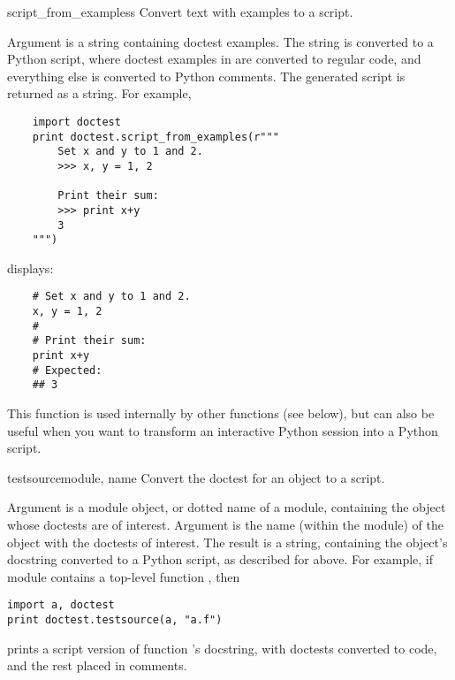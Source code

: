 \begin{funcdesc}{script_from_examples}{s}
  Convert text with examples to a script.

  Argument  is a string containing doctest examples.  The string
  is converted to a Python script, where doctest examples in 
  are converted to regular code, and everything else is converted to
  Python comments.  The generated script is returned as a string.
  For example,

    \begin{verbatim}
    import doctest
    print doctest.script_from_examples(r"""
        Set x and y to 1 and 2.
        >>> x, y = 1, 2

        Print their sum:
        >>> print x+y
        3
    """)
    \end{verbatim}

  displays:

    \begin{verbatim}
    # Set x and y to 1 and 2.
    x, y = 1, 2
    #
    # Print their sum:
    print x+y
    # Expected:
    ## 3
    \end{verbatim}

  This function is used internally by other functions (see below), but
  can also be useful when you want to transform an interactive Python
  session into a Python script.

\end{funcdesc}

\begin{funcdesc}{testsource}{module, name}
   Convert the doctest for an object to a script.

   Argument  is a module object, or dotted name of a module,
   containing the object whose doctests are of interest.  Argument
    is the name (within the module) of the object with the
   doctests of interest.  The result is a string, containing the
   object's docstring converted to a Python script, as described for
    above.  For example, if module
    contains a top-level function , then

\begin{verbatim}
import a, doctest
print doctest.testsource(a, "a.f")
\end{verbatim}

  prints a script version of function 's docstring,
  with doctests converted to code, and the rest placed in comments.

\end{funcdesc}

